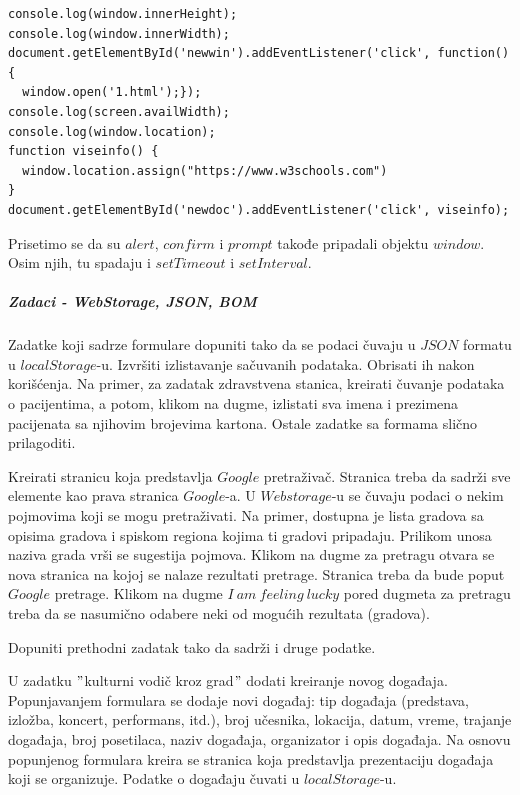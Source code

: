 \begin{lstlisting}[backgroundcolor = \color{lightgray}, breaklines=true]
console.log(window.innerHeight);
console.log(window.innerWidth);
document.getElementById('newwin').addEventListener('click', function(){
  window.open('1.html');});
console.log(screen.availWidth); 
console.log(window.location);
function viseinfo() {	
  window.location.assign("https://www.w3schools.com")
}
document.getElementById('newdoc').addEventListener('click', viseinfo);
\end{lstlisting}

Prisetimo se da su $alert$, $confirm$ i $prompt$ takođe pripadali objektu $window$. Osim njih, tu spadaju i $setTimeout$ i $setInterval$.

\subparagraph{Zadaci - WebStorage, JSON, BOM}
\begin{primer}
Zadatke koji sadrze formulare dopuniti tako da se podaci čuvaju u $JSON$ formatu u $localStorage$-u. Izvršiti izlistavanje sačuvanih podataka. Obrisati ih nakon korišćenja. Na primer, za zadatak zdravstvena stanica, kreirati čuvanje podataka o pacijentima, a potom, klikom na dugme, izlistati sva imena i prezimena pacijenata sa njihovim brojevima kartona. Ostale zadatke sa formama slično prilagoditi. 
\end{primer}

\begin{primer}
Kreirati stranicu koja predstavlja $Google$ pretraživač. Stranica treba da sadrži sve elemente kao prava stranica $Google$-a. U $Web storage$-u se čuvaju podaci o nekim pojmovima koji se mogu pretraživati. Na primer, dostupna je lista gradova sa opisima gradova i spiskom regiona kojima ti gradovi pripadaju. Prilikom unosa naziva grada vrši se sugestija pojmova. Klikom na dugme za pretragu otvara se nova stranica na kojoj se nalaze rezultati pretrage. Stranica treba da bude poput $Google$ pretrage. Klikom na dugme $I\ am\ feeling\ lucky$ pored dugmeta za pretragu treba da se nasumično odabere neki od mogućih rezultata (gradova). 
\end{primer}

\begin{primer}
Dopuniti prethodni zadatak tako da sadrži i druge podatke. 
\end{primer}

\begin{primer}
U zadatku $"$kulturni vodič kroz grad$"$ dodati kreiranje novog događaja. Popunjavanjem formulara se dodaje novi događaj: tip događaja (predstava, izložba, koncert, performans, itd.), broj učesnika, lokacija, datum, vreme, trajanje događaja, broj posetilaca, naziv događaja,  organizator i opis događaja. Na osnovu popunjenog formulara kreira se stranica koja predstavlja prezentaciju događaja koji se organizuje. Podatke o događaju čuvati u $localStorage$-u. 
\end{primer}

